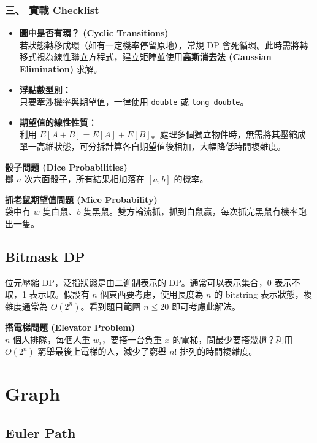 \documentclass[a4paper,10pt,twocolumn,oneside]{article}
\begin{document}
\subsubsection*{三、 實戰 Checklist}
\begin{itemize}
    \item \textbf{圖中是否有環？ (Cyclic Transitions)} \\
    若狀態轉移成環（如有一定機率停留原地），常規 DP 會死循環。此時需將轉移式視為線性聯立方程式，建立矩陣並使用\textbf{高斯消去法 (Gaussian Elimination)} 求解。
    \item \textbf{浮點數型別：} \\
    只要牽涉機率與期望值，一律使用 \texttt{double} 或 \texttt{long double}。
    \item \textbf{期望值的線性性質：} \\
    利用 $E[A + B] = E[A] + E[B]$。處理多個獨立物件時，無需將其壓縮成單一高維狀態，可分拆計算各自期望值後相加，大幅降低時間複雜度。
\end{itemize}
\textbf{骰子問題 (Dice Probabilities)} \\
擲 $n$ 次六面骰子，所有結果相加落在 $[a, b]$ 的機率。



\textbf{抓老鼠期望值問題 (Mice Probability)} \\
袋中有 $w$ 隻白鼠、$b$ 隻黑鼠。雙方輪流抓，抓到白鼠贏，每次抓完黑鼠有機率跑出一隻。



\subsection{Bitmask DP}
位元壓縮 DP，泛指狀態是由二進制表示的 DP。通常可以表示集合，0 表示不取，1 表示取。假設有 $n$ 個東西要考慮，使用長度為 $n$ 的 bitstring 表示狀態，複雜度通常為 $O(2^n)$。看到題目範圍 $n \le 20$ 即可考慮此解法。

\textbf{搭電梯問題 (Elevator Problem)} \\
$n$ 個人排隊，每個人重 $w_i$，要搭一台負重 $x$ 的電梯，問最少要搭幾趟？利用 $O(2^n)$ 窮舉最後上電梯的人，減少了窮舉 $n!$ 排列的時間複雜度。



\section{Graph}
\subsection{Euler Path}

\end{document}

